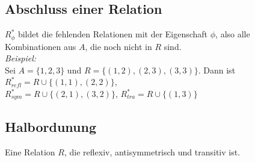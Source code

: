 \subsection*{Abschluss einer Relation}
$R_\phi^*$ bildet die fehlenden Relationen mit der Eigenschaft $\phi$, also alle Kombinationen aus $A$, die noch nicht in $R$ sind.\\
\emph{Beispiel:}\\
Sei $A=\{1,2,3\}$ und $R=\{(1,2),(2,3),(3,3)\}$. 
Dann ist $R_{refl}^*=R\cup\{(1,1),(2,2)\}$,\\
$R_{sym}^*=R\cup\{(2,1),(3,2)\}$,
$R_{tra}^*=R\cup\{(1,3)\}$
\subsection*{Halbordunung}
Eine Relation $R$, die reflexiv, antisymmetrisch und transitiv ist.